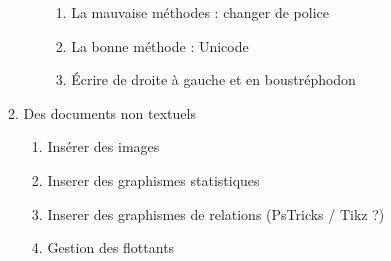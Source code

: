 \begin{enumerate}
\begin{enumerate}
\begin{enumerate}
\begin{enumerate}
			\item La mauvaise méthodes : changer de police
			\item La bonne méthode : Unicode
			\item Écrire de droite à gauche et en boustréphodon
		\end{enumerate}
		\end{enumerate}
	\item Des documents non textuels
		\begin{enumerate}
		\item Insérer des images
		\item Inserer des graphismes statistiques
		\item Inserer des graphismes de relations (PsTricks / Tikz ?)
		\item Gestion des flottants
		\end{enumerate}
\end{enumerate}


\end{enumerate}
